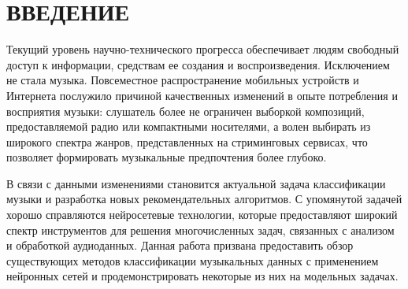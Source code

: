 \chapter*{\large ВВЕДЕНИЕ}  
Текущий уровень научно-технического прогресса обеспечивает 
людям свободный
доступ к информации, средствам ее создания и воспроизведения. Исключением не
стала музыка. Повсеместное распространение мобильных устройств и 
Интернета послужило причиной качественных изменений в опыте потребления и
восприятия музыки: слушатель более не ограничен выборкой композиций, предоставляемой
радио или компактными носителями, а волен выбирать из широкого спектра жанров,
представленных на стриминговых сервисах, что позволяет формировать музыкальные
предпочтения более глубоко.

В связи с данными изменениями становится актуальной задача
классификации музыки и разработка новых рекомендательных
алгоритмов. С упомянутой задачей хорошо справляются нейросетевые
технологии, которые предоставляют широкий спектр инструментов
для решения многочисленных задач, связанных с анализом и обработкой
аудиоданных. Данная работа призвана предоставить обзор
существующих методов классификации музыкальных данных с применением
нейронных сетей и продемонстрировать некоторые из них на
модельных задачах.


